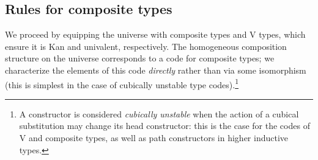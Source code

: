 \documentclass[final]{amsart}
\begin{document}
\subsection{Rules for composite types}

We proceed by equipping the universe with composite types and V types, which
ensure it is Kan and univalent, respectively. The homogeneous composition
structure on the universe corresponds to a code for composite types; we
characterize the elements of this code \emph{directly} rather than via some
isomorphism (this is simplest in the case of cubically unstable type
codes).\footnote{A constructor is considered \emph{cubically unstable} when the action
of a cubical substitution may change its head constructor: this is the case for
the codes of V and composite types, as well as path constructors in higher
inductive types.}
\end{document}
